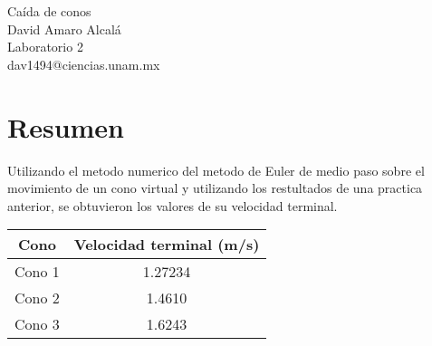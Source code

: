 \begin{center}
    {\huge Caída de conos}\\
    {\normalsize David Amaro Alcalá}\\
    {\normalsize Laboratorio 2}\\
    dav1494@ciencias.unam.mx\\
\end{center}

\section*{Resumen}

Utilizando el metodo numerico del metodo 
de Euler de medio paso sobre el movimiento
de un cono virtual y utilizando los restultados
de una practica anterior, se obtuvieron los
valores de su velocidad terminal.

\begin{Tabla}
    \centering
    \begin{tabular}{|c|c|}
        \hline
        \rowcolor{azulito} Cono & Velocidad terminal (m/s) \\
        \hline Cono 1 & 1.27234 \\
        \hline Cono 2 & 1.4610 \\
        \hline Cono 3 & 1.6243 \\
        \hline
    \end{tabular}
\end{Tabla}
